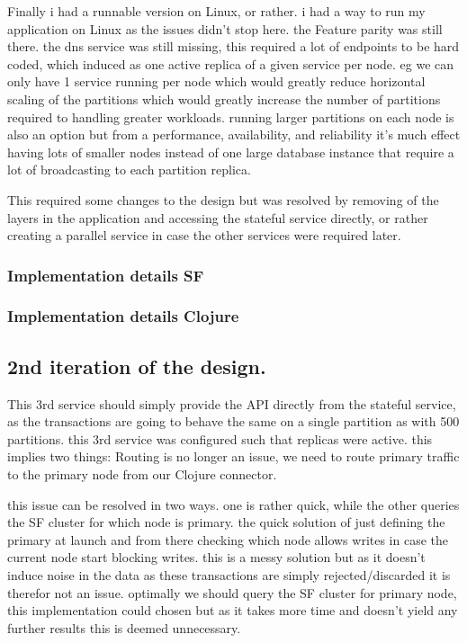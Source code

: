 \documentclass[a4paper,10pt,titlepage]{report}
\begin{document}
    Finally i had a runnable version on Linux, or rather. i had a way to run my application on Linux as the issues didn't stop here. the Feature parity was still there. the dns service was still missing, this required a lot of endpoints to be hard coded, which induced as one active replica of a given service per node. eg we can only have 1 service running per node which would greatly reduce horizontal scaling of the partitions which would greatly increase the number of partitions required to handling greater workloads. running larger partitions on each node is also an option but from a performance, availability, and reliability it's much effect having lots of smaller nodes instead of one large database instance that require a lot of broadcasting to each partition replica.


    This required some changes to the design but was resolved by removing of the layers in the application and accessing the stateful service directly, or rather creating a parallel service in case the other services were required later.

    \subsubsection{Implementation details SF}

    \subsubsection{Implementation details Clojure}

    \subsection{2nd iteration of the design.}

    This 3rd service should simply provide the API directly from the stateful service, as the transactions are going to behave the same on a single partition as with 500 partitions. this 3rd service was configured such that replicas were active. this implies two things: Routing is no longer an issue, we need to route primary traffic to the primary node from our Clojure connector.

    this issue can be resolved in two ways. one is rather quick, while the other queries the SF cluster for which node is primary. the quick solution of just defining the primary at launch and from there checking which node allows writes in case the current node start blocking writes. this is a messy solution but as it doesn't induce noise in the data as these transactions are simply rejected/discarded it is therefor not an issue. optimally we should query the SF cluster for primary node, this implementation could chosen but as it takes more time and doesn't yield any further results this is deemed unnecessary.
\end{document}
